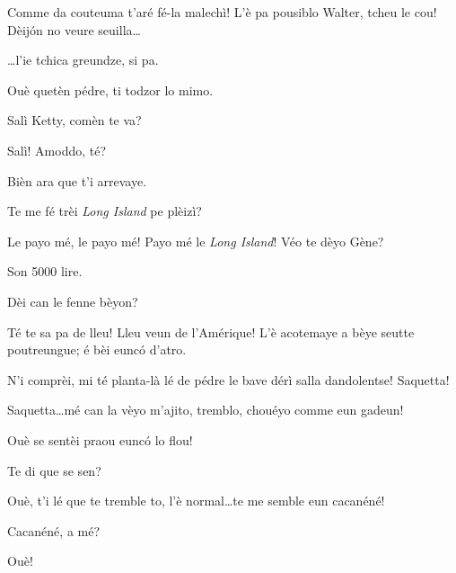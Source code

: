 \begin{drama}
\Kettyspeaks Comme da couteuma t’aré fé-la  malechì! L'è pa pousiblo Walter, tcheu le cou! Dèij\'on no veure seuilla\ldots


\Walterspeaks \ldots l'ie tchica greundze, si pa.

\Kettyspeaks Ouè quetèn pédre, ti todzor lo mimo.


\Selmospeaks 	{} Salì Ketty, comèn te va? 

\Kettyspeaks{} Salì! Amoddo, té?

\Selmospeaks Bièn ara que t'i arrevaye.

\Kettyspeaks {} Te me fé trèi \textit{Long Island} pe plèizì?


\Selmospeaks Le payo mé, le payo mé! Payo mé le \textit{Long Island}! Véo te dèyo Gène?

\Genespeaks Son 5000 lire.


\Walterspeaks{} Dèi can le fenne bèyon?

\Selmospeaks Té te sa pa de lleu! Lleu veun de l'Amérique! L'è acotemaye a bèye seutte poutreungue; é bèi eunc\'o d'atro.


\Walterspeaks	N'i comprèi, mi té planta-là lé de pédre le bave dérì salla dandolentse! Saquetta!

\Selmospeaks{} Saquetta\ldots mé can la vèyo m'ajito, tremblo, chouéyo comme eun gadeun!

\Walterspeaks	Ouè se sentèi praou eunc\'o lo flou!

\Selmospeaks{} Te di que se sen?

\Walterspeaks Ouè, t'i lé que te tremble to, l'è normal\ldots te me semble eun cacanéné!

\Selmospeaks{} Cacanéné, a mé? 	

\Walterspeaks Ouè!


\end{drama}
